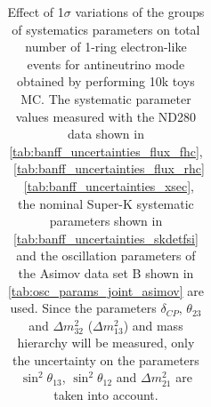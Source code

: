 \begin{table}[htb]
\begin{tabular}{| c | c | c |}
\end{tabular}
\caption{
 Effect of 1$\sigma$ variations of the groups of systematics parameters on total number of
 1-ring electron-like events for antineutrino mode obtained by performing 10k toys MC.
The systematic parameter values measured with the ND280 data 
shown in 
\cref{tab:banff_uncertainties_flux_fhc},
~\ref{tab:banff_uncertainties_flux_rhc}
~\ref{tab:banff_uncertainties_xsec},
the nominal Super-K systematic parameters shown in \cref{tab:banff_uncertainties_skdetfsi}
and the oscillation parameters of the Asimov data set B shown in \cref{tab:osc_params_joint_asimov}
are used.
Since the parameters $\delta_{CP}$, $\theta_{23}$ and $\Delta m^2_{32}$ ($\Delta m^2_{13}$) and mass hierarchy
will be measured,
only the uncertainty on the parameters 
$\sin^2 \theta_{13}$,
$\sin^2 \theta_{12}$
and 
$\Delta m^2_{21}$ 
are taken into account.
}                                                                                                                                                                                          
\label{tab:nsk_systematic_table_summary_joint_asimov_B_rhc_elike_Run17b}
\end{table}


















